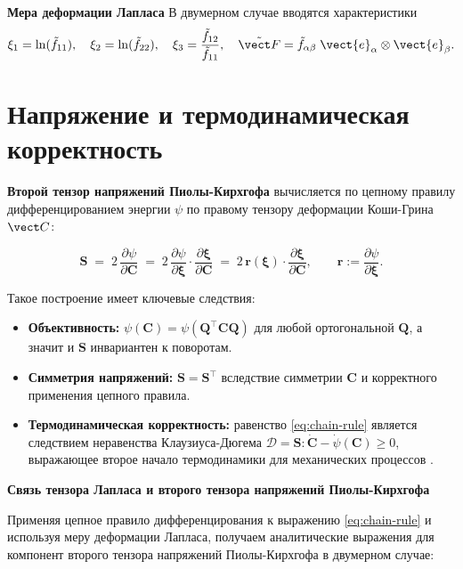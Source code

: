 \textbf{Мера деформации Лапласа}
В двумерном случае вводятся характеристики
\begin{equation}
\xi_1 = \ln(\tilde f_{11}),\quad \xi_2 = \ln(\tilde f_{22}),\quad \xi_3 = \frac{\tilde f_{12}}{\tilde f_{11}}, 
\quad \tilde{\vect F} = \tilde f_{\alpha\beta} \; \vect{e}_{\alpha} \otimes \vect{e}_{\beta}.
\label{eq:laplace_coords}
\end{equation}



\section{Напряжение и термодинамическая корректность}
\textbf{Второй тензор напряжений Пиолы-Кирхгофа} вычисляется по цепному правилу дифференцированием энергии \(\psi\) 
по правому тензору деформации Коши-Грина \(\vect C\):

\begin{equation}
  \mathbf{S} \;=\; 2\,\frac{\partial \psi}{\partial \mathbf{C}}
  \;=\; 2\,\frac{\partial \psi}{\partial \boldsymbol\xi} \cdot \frac{\partial \boldsymbol\xi}{\partial \mathbf{C}}
  \;=\; 2\,\mathbf{r}(\boldsymbol\xi)\cdot\frac{\partial \boldsymbol\xi}{\partial \mathbf{C}},
  \qquad \mathbf{r}:=\frac{\partial \psi}{\partial \boldsymbol\xi}.
  \label{eq:chain-rule}
\end{equation}

Такое построение имеет ключевые следствия:
\begin{itemize}
  \item \textbf{Объективность:} $\psi(\mathbf{C})=\psi(\mathbf{Q}^\top\mathbf{C}\mathbf{Q})$ для любой ортогональной $\mathbf{Q}$, а значит и $\mathbf{S}$ инвариантен к поворотам.
  \item \textbf{Симметрия напряжений:} $\mathbf{S}=\mathbf{S}^\top$ вследствие симметрии $\mathbf{C}$ и корректного применения цепного правила.
  \item \textbf{Термодинамическая корректность:} равенство \eqref{eq:chain-rule} является следствием неравенства Клаузиуса-Дюгема 
  $\mathcal{D} = \mathbf{S} : \dot{\mathbf{C}} - \dot{\psi}(\mathbf{C}) \geq 0$, 
  выражающее второе начало термодинамики для механических процессов \cite{truesdell1984historical,truesdell2004nonlinear}.
\end{itemize}

\textbf{Связь тензора Лапласа и второго тензора напряжений Пиолы-Кирхгофа}

Применяя цепное правило дифференцирования к выражению \eqref{eq:chain-rule} и используя меру деформации Лапласа, 
получаем аналитические выражения для компонент второго тензора напряжений Пиолы-Кирхгофа в двумерном случае:

